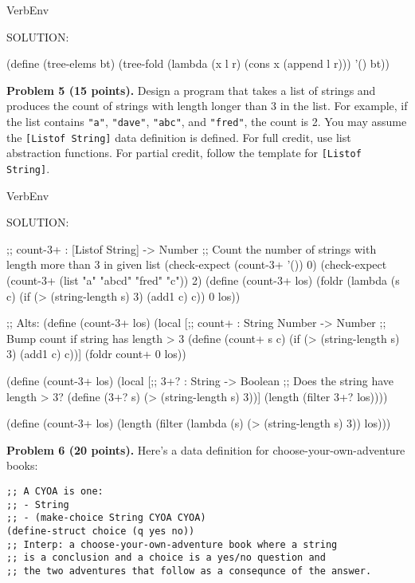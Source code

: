 \documentclass[12pt]{article}
\begin{document}
\begin{SaveVerbatim}{VerbEnv}


SOLUTION:

(define (tree-elems bt)
  (tree-fold (lambda (x l r) (cons x (append l r))) '() bt))

\end{SaveVerbatim}




\newpage
\noindent
{\bf Problem 5 (15 points).}  
%
Design a program that takes a list of strings and produces the count
of strings with length longer than 3 in the list.  For example, if the
list contains {\tt "a"}, {\tt "dave"}, {\tt "abc"}, and {\tt "fred"},
the count is 2.  You may assume the {\tt{[Listof String]}} data
definition is defined.
%
For full credit, use list abstraction functions.  For partial credit,
follow the template for {\tt{[Listof String]}}.


\begin{SaveVerbatim}{VerbEnv}


SOLUTION:

;; count-3+ : [Listof String] -> Number
;; Count the number of strings with length more than 3 in given list
(check-expect (count-3+ '()) 0)
(check-expect (count-3+ (list "a" "abcd" "fred" "c")) 2)
(define (count-3+ los)
  (foldr (lambda (s c) (if (> (string-length s) 3) (add1 c) c)) 0 los))

;; Alts:
(define (count-3+ los)
  (local [;; count+ : String Number -> Number
          ;; Bump count if string has length > 3
          (define (count+ s c) 
            (if (> (string-length s) 3) (add1 c) c))]
    (foldr count+ 0 los))

(define (count-3+ los)
  (local [;; 3+? : String -> Boolean
          ;; Does the string have length > 3?
          (define (3+? s) 
            (> (string-length s) 3))]
    (length (filter 3+? los))))

(define (count-3+ los)
  (length (filter (lambda (s) (> (string-length s) 3)) los)))
\end{SaveVerbatim}





\newpage

\noindent
{\bf Problem 6 (20 points).}
%
Here's a data definition for choose-your-own-adventure books:
\begin{verbatim}
;; A CYOA is one:
;; - String
;; - (make-choice String CYOA CYOA)
(define-struct choice (q yes no))
;; Interp: a choose-your-own-adventure book where a string
;; is a conclusion and a choice is a yes/no question and
;; the two adventures that follow as a consequnce of the answer.
\end{verbatim}
\end{document}

